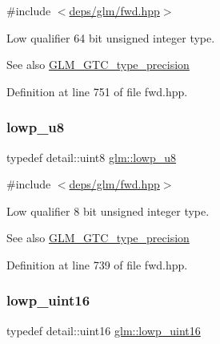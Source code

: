 {\ttfamily \#include $<$\hyperlink{fwd_8hpp}{deps/glm/fwd.\+hpp}$>$}

Low qualifier 64 bit unsigned integer type. \begin{DoxySeeAlso}{See also}
\hyperlink{group__gtc__type__precision}{G\+L\+M\+\_\+\+G\+T\+C\+\_\+type\+\_\+precision} 
\end{DoxySeeAlso}


Definition at line 751 of file fwd.\+hpp.

\mbox{\label{group__gtc__type__precision_gae63f942c49a30dbf266b2f13f3efe257}} 
\subsubsection{\texorpdfstring{lowp\+\_\+u8}{lowp\_u8}}
{\footnotesize\ttfamily typedef detail\+::uint8 \hyperlink{group__gtc__type__precision_gae63f942c49a30dbf266b2f13f3efe257}{glm\+::lowp\+\_\+u8}}



{\ttfamily \#include $<$\hyperlink{fwd_8hpp}{deps/glm/fwd.\+hpp}$>$}

Low qualifier 8 bit unsigned integer type. \begin{DoxySeeAlso}{See also}
\hyperlink{group__gtc__type__precision}{G\+L\+M\+\_\+\+G\+T\+C\+\_\+type\+\_\+precision} 
\end{DoxySeeAlso}


Definition at line 739 of file fwd.\+hpp.

\mbox{\label{group__gtc__type__precision_ga9b8409887319f62f06e664f6ca121b9d}} 
\subsubsection{\texorpdfstring{lowp\+\_\+uint16}{lowp\_uint16}}
{\footnotesize\ttfamily typedef detail\+::uint16 \hyperlink{group__gtc__type__precision_ga9b8409887319f62f06e664f6ca121b9d}{glm\+::lowp\+\_\+uint16}}



